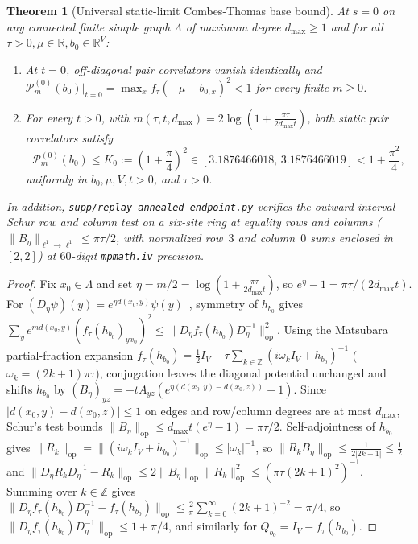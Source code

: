 \documentclass[11pt]{article}
\newtheorem{theorem}{Theorem}[section]
\theoremstyle{definition}
\theoremstyle{remark}
\newcommand{\R}{\mathbb{R}}
\newcommand{\Z}{\mathbb{Z}}
\begin{document}
\begin{theorem}[Universal static-limit Combes-Thomas base bound]
\label{thm:ae-k0}
At $s = 0$ on any connected finite simple graph $\Lambda$ of maximum degree
$d_{\max} \ge 1$ and for all $\tau > 0, \mu \in \R, b_0 \in \R^V$:
\begin{enumerate}[leftmargin=1.5em]
\item At $t = 0$, off-diagonal pair correlators vanish identically and
$\mathcal{P}_m^{(0)}(b_0)|_{t=0} = \max_x f_\tau(-\mu-b_{0,x})^2 < 1$ for
every finite $m \ge 0$.
\item For every $t > 0$, with $m(\tau,t,d_{\max}) = 2\log(1 + \frac{\pi\tau}{2 d_{\max} t})$,
both static pair correlators satisfy
\begin{equation}
\label{eq:ae-k0}
\mathcal{P}_m^{(0)}(b_0)
\le K_0 := \left(1 + \frac{\pi}{4}\right)^2 \in [3.1876466018,\, 3.1876466019]
< 1 + \frac{\pi^2}{4},
\end{equation}
uniformly in $b_0, \mu, V, t > 0$, and $\tau > 0$.
\end{enumerate}
In addition, \texttt{supp/replay-annealed-endpoint.py} verifies the outward
interval Schur row and column test on a six-site ring at equality rows and
columns ($\|B_\eta\|_{\ell^1 \to \ell^1} \le \pi\tau/2$, with normalized row~$3$
and column~$0$ sums enclosed in $[2,2]$) at $60$-digit \texttt{mpmath.iv} precision.
\end{theorem}

\begin{proof}
Fix $x_0 \in \Lambda$ and set $\eta = m/2 = \log(1 + \frac{\pi\tau}{2 d_{\max} t})$,
so $e^\eta - 1 = \pi\tau/(2 d_{\max} t)$. For $(D_\eta \psi)(y) = e^{\eta d(x_0,y)}\psi(y)$~\cite{combes1973},
symmetry of $h_{b_0}$ gives
$\sum_y e^{m d(x_0,y)} (f_\tau(h_{b_0})_{yx_0})^2 \le \|D_\eta f_\tau(h_{b_0}) D_\eta^{-1}\|_{\mathrm{op}}^2$.
Using the Matsubara partial-fraction expansion
$f_\tau(h_{b_0}) = \frac{1}{2}I_V - \tau \sum_{k\in\Z}(i\omega_k I_V + h_{b_0})^{-1}$
($\omega_k = (2k+1)\pi\tau$), conjugation leaves the diagonal potential
unchanged and shifts $h_{b_0}$ by $(B_\eta)_{yz} = -t A_{yz}(e^{\eta(d(x_0,y)-d(x_0,z))} - 1)$.
Since $|d(x_0,y)-d(x_0,z)| \le 1$ on edges and row/column degrees are at most
$d_{\max}$, Schur's test bounds $\|B_\eta\|_{\mathrm{op}} \le d_{\max} t(e^\eta - 1) = \pi\tau/2$.
Self-adjointness of $h_{b_0}$ gives $\|R_k\|_{\mathrm{op}} = \|(i\omega_k I_V + h_{b_0})^{-1}\|_{\mathrm{op}} \le |\omega_k|^{-1}$,
so $\|R_k B_\eta\|_{\mathrm{op}} \le \frac{1}{2|2k+1|} \le \frac{1}{2}$ and
$\|D_\eta R_k D_\eta^{-1} - R_k\|_{\mathrm{op}} \le 2\|B_\eta\|_{\mathrm{op}}\|R_k\|_{\mathrm{op}}^2 \le (\pi\tau (2k+1)^2)^{-1}$.
Summing over $k \in \Z$ gives $\|D_\eta f_\tau(h_{b_0}) D_\eta^{-1} - f_\tau(h_{b_0})\|_{\mathrm{op}} \le \frac{2}{\pi}\sum_{k=0}^\infty (2k+1)^{-2} = \pi/4$,
so $\|D_\eta f_\tau(h_{b_0}) D_\eta^{-1}\|_{\mathrm{op}} \le 1 + \pi/4$, and
similarly for $Q_{b_0} = I_V - f_\tau(h_{b_0})$.
\end{proof}
\end{document}

